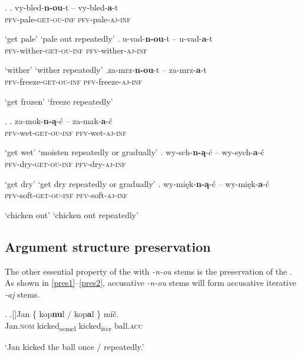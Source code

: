 \ex. 
\ag. vy-bled-\textbf{n-ou}-t -- vy-bled-\textbf{a}-t\\
\textsc{pfv}-pale-\textsc{get-ou}-\textsc{inf} {} \textsc{pfv}-pale-\textsc{aj}-\textsc{inf}\\
\strut `get pale' \hskip 62pt `pale out repeatedly'
\bg. u-vad-\textbf{n-ou}-t -- u-vad-\textbf{a}-t\\
\textsc{pfv}-wither-\textsc{get-ou}-\textsc{inf} {} \textsc{pfv}-wither-\textsc{aj}-\textsc{inf}\\
\strut `wither' \hskip 77.5pt `wither repeatedly'
\cg.za-mrz-\textbf{n-ou}-t -- za-mrz-\textbf{a}-t\\
\textsc{pfv}-freeze-\textsc{get-ou}-\textsc{inf} {} \textsc{pfv}-freeze-\textsc{aj}-\textsc{inf}\\
\strut `get frozen' \hskip 60pt `freeze repeatedly'

\ex. 
\ag.	
za-mok-\textbf{n-\k{a}}-\'c -- za-mak-\textbf{a}-\'c \\
\textsc{pfv}-wet-\textsc{get-ou}-\textsc{inf} {} \textsc{pfv}-wet-\textsc{aj}-\textsc{inf}\\
\strut `get wet' \hskip 62pt `moisten repeatedly or gradually'
\bg.
wy-sch-\textbf{n-\k{a}}-\'c -- wy-sych-\textbf{a}-\'c \\
\textsc{pfv}-dry-\textsc{get-ou}-\textsc{inf} {} \textsc{pfv}-dry-\textsc{aj}-\textsc{inf}\\
\strut `get dry' \hskip 61.5pt `get dry repeatedly or gradually'
\cg.
wy-mi\k{e}k-\textbf{n-\k{a}}-\'c -- wy-mi\k{e}k-\textbf{a}-\'c\\
\textsc{pfv}-soft-\textsc{get-ou}-\textsc{inf} {} \textsc{pfv}-soft-\textsc{aj}-\textsc{inf}\\
\strut `chicken out' \hskip 42pt `chicken out repeatedly'


\subsection{Argument structure preservation}

The other essential property of the   with \textit{-n-ou} stems is the preservation of the . As shown in \ref{pres1}--\ref{pres2}, accusative  \textit{-n-ou}  stems will form accusative iterative \textit{-aj} stems. 

\ex.\label{pres1} 
\ag.[]\hspace{-22pt}Jan \{ kop\textbf{nu}l  {/} {kop\textbf{a}l \}} m\'i\v{c}.\\
\hspace{-22pt}Jan.\textsc{nom} {}  kicked\textsubscript{semel} {}  {kicked\textsubscript{iter}}  ball.\textsc{acc}\\ 
\hspace{-22pt}\strut `Jan kicked the ball once / repeatedly.'

